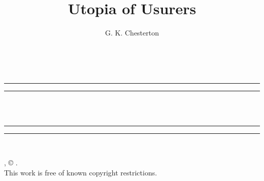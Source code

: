 \documentclass{book}
\date{}
\title{Utopia of Usurers}
\author{G. K. Chesterton}
\begin{document}
\thispagestyle{empty}
\begin{center}
	{\Huge \@title   \\[5mm]}
\end{center}
\newpage
\thispagestyle{empty}
\cleardoublepage
\begin{center}
	\thispagestyle{empty}
	\vspace*{\baselineskip}
	\rule{\textwidth}{1.6pt}\vspace*{-\baselineskip}\vspace*{2pt}
	\rule{\textwidth}{0.4pt}\\[\baselineskip]
	{\Huge\scshape \@title   \\[5mm]}
	{\Large }
	\rule{\textwidth}{0.4pt}\vspace*{-\baselineskip}\vspace{3.2pt}
	\rule{\textwidth}{1.6pt}\\[\baselineskip]
	\vspace*{4\baselineskip}
	{\Large \@author}
	\vfill
\end{center}
\pagebreak
\newpage
\thispagestyle{empty}
\null\vfill
\noindent
\begin{center}
	{\emph{\@title}, © \@author.\\[5mm]}
	{This work is free of known copyright restrictions.\\[5mm]}
\end{center}
\pagebreak
\newpage
\setcounter{tocdepth}{0}
\setcounter{secnumdepth}{0}
\end{document}
